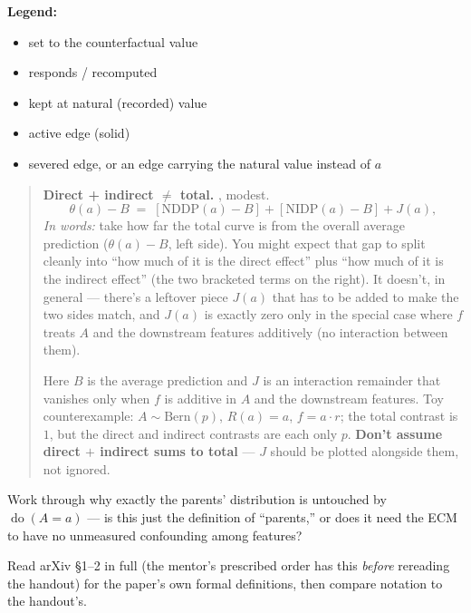 \noindent\textbf{Legend:}
\begin{itemize}[leftmargin=1.6em, itemsep=2pt]
  \item[\textcolor{accentc}{$\bullet$}] set to the counterfactual value
  \item[\textcolor{respondc}{$\bullet$}] responds / recomputed
  \item[\textcolor{naturalc}{$\bullet$}] kept at natural (recorded) value
  \item[-----] active edge (solid)
  \item[- - -] severed edge, or an edge carrying the natural value instead
    of $a$
\end{itemize}

\begin{quote}
\textbf{Direct + indirect $\neq$ total.} \newtag, modest.
\[
  \theta(a) - B \;=\; [\mathrm{NDDP}(a) - B] + [\mathrm{NIDP}(a) - B] + J(a),
\]
\emph{In words:} take how far the total curve is from the overall average
prediction ($\theta(a) - B$, left side). You might expect that gap to split
cleanly into ``how much of it is the direct effect'' plus ``how much of it
is the indirect effect'' (the two bracketed terms on the right). It doesn't,
in general --- there's a leftover piece $J(a)$ that has to be added to make
the two sides match, and $J(a)$ is exactly zero only in the special case
where $f$ treats $A$ and the downstream features additively (no
interaction between them).

Here $B$ is the average prediction and $J$ is an interaction remainder that
vanishes only when $f$ is additive in $A$ and the downstream features. Toy
counterexample: $A \sim \mathrm{Bern}(p)$, $R(a) = a$, $f = a \cdot r$; the
total contrast is $1$, but the direct and indirect contrasts are each only
$p$. \textbf{Don't assume direct $+$ indirect sums to total} --- $J$ should
be plotted alongside them, not ignored.
\end{quote}

\begin{openquestions}
  \item Work through why exactly the parents' distribution is untouched by
    $\operatorname{do}(A=a)$ --- is this just the definition of ``parents,''
    or does it need the ECM to have no unmeasured confounding among
    features?
  \item Read arXiv \S1--2 in full (the mentor's prescribed order has this
    \emph{before} rereading the handout) for the paper's own formal
    definitions, then compare notation to the handout's.
\end{openquestions}
